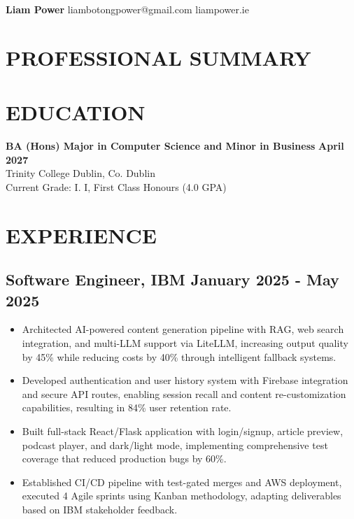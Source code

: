 \documentclass[10pt,a4paper]{article}
\begin{document}
\begin{center}
{\large\bfseries Liam Power} \hfill {\large liambotongpower@gmail.com} \hfill {\large liampower.ie}
\end{center}

\section{PROFESSIONAL SUMMARY} 

\section{EDUCATION}

\textbf{BA (Hons) Major in Computer Science and Minor in Business} \hfill \textbf{April 2027}\\
Trinity College Dublin, Co. Dublin\\
Current Grade: I. I, First Class Honours (4.0 GPA)

\section{EXPERIENCE}

\subsection{Software Engineer, IBM \hfill January 2025 - May 2025}
\begin{itemize}
\item Architected AI-powered content generation pipeline with RAG, web search integration, and multi-LLM support via LiteLLM, increasing output quality by 45\% while reducing costs by 40\% through intelligent fallback systems.
\item Developed authentication and user history system with Firebase integration and secure API routes, enabling session recall and content re-customization capabilities, resulting in 84\% user retention rate.
\item Built full-stack React/Flask application with login/signup, article preview, podcast player, and dark/light mode, implementing comprehensive test coverage that reduced production bugs by 60\%.
\item Established CI/CD pipeline with test-gated merges and AWS deployment, executed 4 Agile sprints using Kanban methodology, adapting deliverables based on IBM stakeholder feedback.
\end{itemize}
\end{document}
